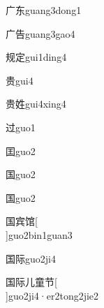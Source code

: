 \begin{verbete*}[3;5]{广东}{guang3dong1}
\end{verbete*}

\begin{verbete}[3;7]{广告}{guang3gao4}
\end{verbete}

\begin{verbete}[8;8]{规定}{gui1ding4}
\end{verbete}

\begin{verbete}[9]{贵}{gui4}
\end{verbete}

\begin{verbete}[9;8]{贵姓}{gui4xing4}
\end{verbete}

\begin{verbete*}[6]{过}{guo1}
\end{verbete*}

\begin{verbete}[7]{囯}{guo2}
\end{verbete}

\begin{verbete}[8]{国}{guo2}
\end{verbete}
\begin{verbete*}[8]{国}{guo2}
\end{verbete*}

\begin{verbete}[8;10;11]{国宾馆}[\\]{guo2bin1guan3}
\end{verbete}

\begin{verbete}[8;7]{国际}{guo2ji4}
\end{verbete}

\begin{verbete*}[8;7;2;12;5]{国际儿童节}[\\]{guo2ji4·er2tong2jie2}
\end{verbete*}


